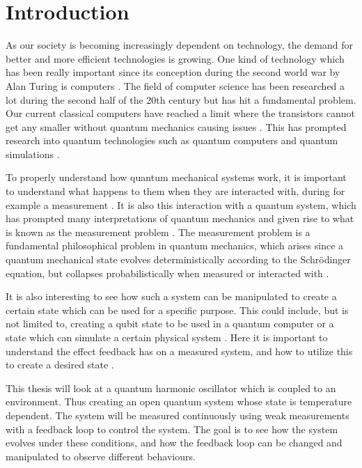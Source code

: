 \section{Introduction}
As our society is becoming increasingly dependent on technology, the demand for better and more efficient technologies is growing. One kind of technology which has been really important since its conception during the second world war by Alan Turing is computers \cite{Nielsen:2010}. The field of computer science has been researched a lot during the second half of the 20th century but has hit a fundamental problem. Our current classical computers have reached a limit where the transistors cannot get any smaller without quantum mechanics causing issues \cite{Nielsen:2010}. This has prompted research into quantum technologies such as quantum computers and quantum simulations \cite{Nielsen:2010}. 

To properly understand how quantum mechanical systems work, it is important to understand what happens to them when they are interacted with, during for example a measurement \cite{Jordan:2024}. It is also this interaction with a quantum system, which has prompted many interpretations of quantum mechanics and given rise to what is known as the measurement problem \cite{Jordan:2024}. The measurement problem is a fundamental philosophical problem in quantum mechanics, which arises since a quantum mechanical state evolves deterministically according to the Schrödinger equation, but collapses probabilistically when measured or interacted with \cite{Jordan:2024}.

It is also interesting to see how such a system can be manipulated to create a certain state which can be used for a specific purpose. This could include, but is not limited to, creating a qubit state to be used in a quantum computer or a state which can simulate a certain physical system \cite{Nielsen:2010}. Here it is important to understand the effect feedback has on a measured system, and how to utilize this to create a desired state \cite{Annby-Andersson:2024}.

This thesis will look at a quantum harmonic oscillator which is coupled to an environment. Thus creating an open quantum system whose state is temperature dependent. The system will be measured continuously using weak measurements with a feedback loop to control the system. The goal is to see how the system evolves under these conditions, and how the feedback loop can be changed and manipulated to observe different behaviours.

